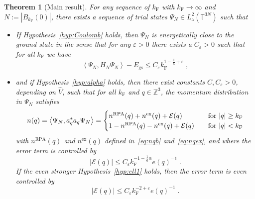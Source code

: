 \documentclass[12pt,a4paper]{article}
\numberwithin{equation}{section}
\newcommand{\cE}{\mathcal{E}}
\newcommand{\1}{\mathbb{I}}
\newcommand{\ex}{\mathrm{ex}}
\newcommand{\F}{\mathrm{F}}
\newcommand{\GS}{\mathrm{gs}}
\newcommand{\RPA}{\mathrm{RPA}}
\newcommand{\Z}{\mathbb{Z}}
\newcommand{\T}{\mathbb{T}}
\newcommand{\eva}[1]{\left\langle #1 \right\rangle}
\theoremstyle{plain}
\newtheorem{theorem}{Theorem}[section]
\theoremstyle{definition}
\theoremstyle{remark}
\theoremstyle{plain}
\theoremstyle{definition}
\theoremstyle{remark}
\begin{document}
\begin{theorem}[Main result] \label{thm:main}
For any sequence of $ k_{\F} $ with $ k_{\F} \to \infty $ and $ N := |B_{k_{\F}}(0)| $, there exists a sequence of trial states  $ \Psi_N \in L^2_{\mathrm{a}}(\T^{3N}) $ such that
\begin{itemize}
\item If Hypothesis~\ref{hyp:Coulomb} holds, then $ \Psi_N $ is energetically close to the ground state in the sense that for any $ \varepsilon > 0 $ there exists a $ C_\varepsilon > 0 $ such that for all $k_\F$ we have
\begin{equation} \label{eq:main1}
	\eva{\Psi_N, H_N \Psi_N} - E_{\GS}
	\le C_\varepsilon k_{\F}^{1-\frac 16 + \varepsilon} \;,
\end{equation}
\item and if Hypothesis~\ref{hyp:alpha} holds, then there exist constants $ C, C_\varepsilon > 0 $, depending on $ \hat{V} $, such that for all $ k_{\F} $ and $ q \in \Z^3 $, the momentum distribution in $ \Psi_N $ satisfies
\begin{equation} \label{eq:main2}
	n(q) = \eva{\Psi_N, a_q^* a_q \Psi_N}
	= \begin{cases}
	n^{\RPA}(q) + n^{\ex}(q) + \cE(q) & \quad
		\textnormal{for } |q| \ge k_{\F} \\
	1 - n^{\RPA}(q) - n^{\ex}(q) + \cE(q) & \quad
		\textnormal{for } |q| < k_{\F} 
	\end{cases}
\end{equation}
with $ n^{\RPA}(q) $ and $ n^{\ex}(q) $ defined in~\eqref{eq:nqb} and~\eqref{eq:nqex}, and where the error term is controlled by
\begin{equation}
	\lvert \cE(q)\rvert \le C_\varepsilon k_{\F}^{-1 - \frac 16 \alpha} e(q)^{-1} \;.
\end{equation}
If the even stronger Hypothesis~\ref{hyp:ell1} holds, then the error term is even controlled by
\begin{equation} \label{eq:main_improvederror}
	\lvert \cE(q)\rvert \le C_\varepsilon k_{\F}^{-2 +\varepsilon} e(q)^{-1} \;.
\end{equation}
\end{itemize}
\end{theorem}
\end{document}

